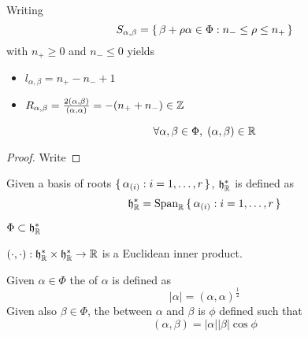 \documentclass{article}
\begin{document}
\begin{fact}
	Writing
	\[
	S_{\alpha, \beta}=\set{  \beta+\rho\alpha\in\Phi : n_- \leq \rho \leq n_+  }
	\]
	with $n_+ \geq 0$ and $n_- \leq 0$ yields
	\begin{itemize}
		\item $l_{\alpha,\beta}=n_+-n_-+1$
		\item $R_{\alpha,\beta}=\frac{2(\alpha,\beta)}{(\alpha,\alpha)} = -(n_+ + n_-) \in\mathbb{Z}$
	\end{itemize}
\end{fact}



\begin{lemma}
	\[
	\forall \alpha, \beta\in\Phi, \; (\alpha, \beta)\in\mathbb{R}
	\]
\end{lemma}
\begin{proof}
	Write 
\end{proof}

\begin{definition}
	Given a basis of roots $\set{  \alpha_{(i)} : i=1,\dots,r  }$, $\mathfrak{h}^\ast_{\mathbb{R}}$ is defined as 
	\[
	\mathfrak{h}^\ast_{\mathbb{R}} = \operatorname{Span}_{\mathbb{R}} \set{  \alpha_{(i)} : i=1,\dots,r  }
	\]
\end{definition}

\begin{fact}
	$\Phi\subset\mathfrak{h}^\ast_{\mathbb{R}}$
\end{fact}

\begin{theorem}
	$(\cdot,\cdot) : \mathfrak{h}^\ast_{\mathbb{R}} \times \mathfrak{h}^\ast_{\mathbb{R}} \to \mathbb{R}$ is a Euclidean inner product. 
\end{theorem}

\begin{definition}
	Given $\alpha\in\Phi$ the  of $\alpha$ is defined as 
	\[
	|\alpha|=(\alpha,\alpha)^\frac{1}{2}
	\]
	Given also $\beta\in\Phi$, the  between $\alpha$ and $\beta$ is $\phi$ defined such that 
	\[
	(\alpha, \beta) = |\alpha||\beta|\cos{\phi}
	\]
\end{definition}
\end{document}
